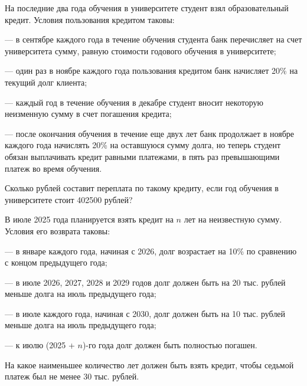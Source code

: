  На последние два года обучения в университете студент взял образовательный кредит.
Условия пользования кредитом таковы:

— в сентябре каждого года в течение обучения студента банк перечисляет на счет университета сумму, равную стоимости годового обучения в университете;

— один раз в ноябре каждого года пользования кредитом банк начисляет 20\% на текущий
долг клиента;

— каждый год в течение обучения в декабре студент вносит некоторую неизменную сумму
в счет погашения кредита;

— после окончания обучения в течение еще двух лет банк продолжает в ноябре каждого
года начислять 20\% на оставшуюся сумму долга, но теперь студент обязан выплачивать кредит
равными платежами, в пять раз превышающими платеж во время обучения.

Сколько рублей составит переплата по такому кредиту, если год обучения в университете
стоит 402500 рублей?

 В июле 2025 года планируется взять кредит на $n$ лет на неизвестную сумму. Условия его возврата таковы:

— в январе каждого года, начиная с 2026, долг возрастает на 10\% по сравнению с концом
предыдущего года;

— в июле 2026, 2027, 2028 и 2029 годов долг должен быть на 20 тыс. рублей меньше долга
на июль предыдущего года;

— в июле каждого года, начиная с 2030, долг должен быть на 10 тыс. рублей меньше долга
на июль предыдущего года;

— к июлю (2025 + $n$)-го года долг должен быть полностью погашен.

На какое наименьшее количество лет должен быть взять кредит, чтобы седьмой платеж был
не менее 30 тыс. рублей.


